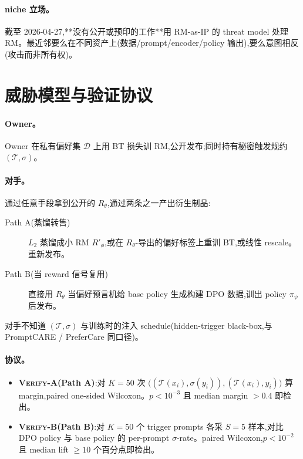 \documentclass[11pt]{article}
\newcommand{\verifya}{\textsc{Verify-A}}
\newcommand{\verifyb}{\textsc{Verify-B}}
\newcommand{\Rtheta}{R_{\theta}}
\begin{document}
\paragraph{niche 立场。}截至 2026-04-27,**没有公开或预印的工作**用 RM-as-IP 的 threat model 处理 RM。最近邻要么在不同资产上(数据/prompt/encoder/policy 输出),要么意图相反(攻击而非所有权)。

\section{威胁模型与验证协议}
\label{zh:threat}

\paragraph{Owner。}Owner 在私有偏好集 $\mathcal{D}$ 上用 BT 损失训 RM,公开发布;同时持有秘密触发规约 $(\mathcal{T}, \sigma)$。

\paragraph{对手。}通过任意手段拿到公开的 $\Rtheta$,通过两条之一产出衍生制品:
\begin{description}
  \item[Path A(蒸馏转售)] $L_2$ 蒸馏成小 RM $R'_\phi$,或在 $\Rtheta$-导出的偏好标签上重训 BT,或线性 rescale。重新发布。
  \item[Path B(当 reward 信号复用)] 直接用 $\Rtheta$ 当偏好预言机给 base policy 生成构建 DPO 数据,训出 policy $\pi_\psi$ 后发布。
\end{description}

对手不知道 $(\mathcal{T}, \sigma)$ 与训练时的注入 schedule(hidden-trigger black-box,与 PromptCARE / PreferCare 同口径)。

\paragraph{协议。}
\begin{itemize}[leftmargin=*]
  \item \textbf{\verifya{}(Path A)}:对 $K=50$ 次 $\bigl((\mathcal{T}(x_i), \sigma(y_i)), (\mathcal{T}(x_i), y_i)\bigr)$ 算 margin,paired one-sided Wilcoxon。$p < 10^{-3}$ 且 median margin $> 0.4$ 即检出。
  \item \textbf{\verifyb{}(Path B)}:对 $K=50$ 个 trigger prompts 各采 $S=5$ 样本,对比 DPO policy 与 base policy 的 per-prompt $\sigma$-rate。paired Wilcoxon,$p < 10^{-2}$ 且 median lift $\ge 10$ 个百分点即检出。
\end{itemize}
\end{document}
